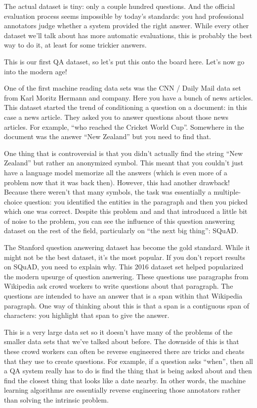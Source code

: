 The actual dataset is tiny: only a couple hundred questions.  And the official evaluation process seems impossible by today’s standards: you had professional annotators judge whether a system provided the right answer.  While every other dataset we’ll talk about has more automatic evaluations, this is probably the best way to do it, at least for some trickier answers.

This is our first QA dataset, so let’s put this onto the board here.  Let’s now go into the modern age!

One of the first machine reading data sets was the CNN / Daily Mail data set from Karl Moritz Hermann and company.  Here you have a bunch of news articles.  This dataset started the trend of conditioning a question on a document: in this case a news article.  They asked you to answer questions about those news articles.  For example, “who reached the Cricket World Cup”.  Somewhere in the document was the answer “New Zealand” but you need to find that.

One thing that is controversial is that you didn’t actually find the string “New Zealand” but rather an anonymized symbol.  This meant that you couldn’t just have a language model memorize all the answers (which is even more of a problem now that it was back then).  However, this had another drawback!  Because there weren’t that many symbols, the task was essentially a multiple-choice question: you identified the entities in the paragraph and then you picked which one was correct.  Despite this problem and and that introduced a little bit of noise to the problem, you can see the influence of this question answering dataset on the rest of the field, particularly on “the next big thing”: SQuAD.

The Stanford question answering dataset has become the gold standard.  While it might not be the best dataset, it’s the most popular.  If you don't report results on SQuAD, you need to explain why.  This 2016 dataset set helped popularized the modern upsurge of question answering.  These questions use paragraphs from Wikipedia ask crowd workers to write questions about that paragraph.  The questions are intended to have an answer that is a span within that Wikipedia paragraph.  One way of thinking about this is that a span is a contiguous span of characters: you highlight that span to give the answer.

This is a very large data set so it doesn't have many of the problems of the smaller data sets that we've talked about before. The downside of this is that these crowd workers can often be reverse engineered there are tricks and cheats that they use to create questions.  For example, if a question asks “when”, then all a QA system really has to do is find the thing that is being asked about and then find the closest thing that looks like a date nearby.  In other words, the machine learning algorithms are essentially reverse engineering those annotators rather than solving the intrinsic problem.

